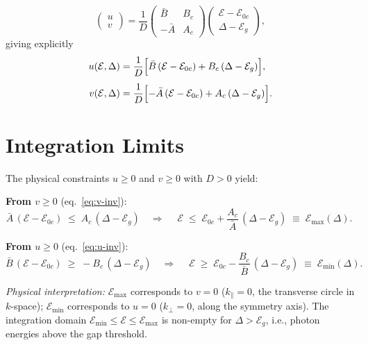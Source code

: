\documentclass[11pt, a4paper]{article}
\newcommand{\E}{\mathcal{E}}
\newcommand{\Eoc}{\E_{0c}}
\newcommand{\Eg}{\E_g}
\newcommand{\Emax}{\E_{\max}}
\newcommand{\Emin}{\E_{\min}}
\newcommand{\Abar}{\bar{A}}
\newcommand{\Bbar}{\bar{B}}
\newcommand{\kperp}{k_{\!\perp}}
\newcommand{\kpar}{k_{\!\parallel}}
\begin{document}
\begin{equation}\label{eq:inverse}
    \begin{pmatrix} u \\ v \end{pmatrix}
    = \frac{1}{D}
    \begin{pmatrix} \Bbar & B_c \\ -\Abar & A_c \end{pmatrix}
    \begin{pmatrix} \E - \Eoc \\ \Delta - \Eg \end{pmatrix},
\end{equation}
giving explicitly
\begin{align}
    u(\E, \Delta) &= \frac{1}{D}\Bigl[\Bbar\,(\E - \Eoc) + B_c\,(\Delta - \Eg)\Bigr], \label{eq:u-inv}\\[4pt]
    v(\E, \Delta) &= \frac{1}{D}\Bigl[-\Abar\,(\E - \Eoc) + A_c\,(\Delta - \Eg)\Bigr]. \label{eq:v-inv}
\end{align}

\section{Integration Limits}\label{sec:limits}

The physical constraints $u \geq 0$ and $v \geq 0$ with $D > 0$ yield:

\medskip
\textbf{From $v \geq 0$} (eq.~\ref{eq:v-inv}):
\begin{equation}\label{eq:Emax}
    \Abar\,(\E - \Eoc) \;\leq\; A_c\,(\Delta - \Eg)
    \quad\Longrightarrow\quad
    \boxed{\;
        \E \;\leq\; \Eoc + \frac{A_c}{\Abar}\,(\Delta - \Eg)
        \;\equiv\; \Emax(\Delta).
    \;}
\end{equation}

\textbf{From $u \geq 0$} (eq.~\ref{eq:u-inv}):
\begin{equation}\label{eq:Emin}
    \Bbar\,(\E - \Eoc) \;\geq\; -B_c\,(\Delta - \Eg)
    \quad\Longrightarrow\quad
    \boxed{\;
        \E \;\geq\; \Eoc - \frac{B_c}{\Bbar}\,(\Delta - \Eg)
        \;\equiv\; \Emin(\Delta).
    \;}
\end{equation}

\textit{Physical interpretation:}
$\Emax$ corresponds to $v = 0$ ($\kpar = 0$, the transverse circle in $k$-space); $\Emin$ corresponds to $u = 0$ ($\kperp = 0$, along the symmetry axis). The integration domain $\Emin \leq \E \leq \Emax$ is non-empty for $\Delta > \Eg$, i.e., photon energies above the gap threshold.
\end{document}
